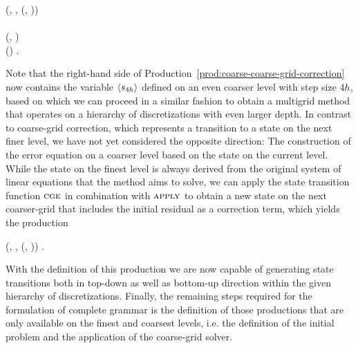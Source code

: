 \begin{bnf}
	 {
		(\bnfts{$\omega$}, \bnfsp {}, \bnfsp {}(, \bnfsp {})) \bnfor
	} \\
	 \\
	 {
		(, \bnfsp {})
	} \\
	 {
		() \bnfsp {} \bnfsp {}.
	}\label{prod:coarse-coarse-grid-correction}
\end{bnf}
Note that the right-hand side of Production~\eqref{prod:coarse-coarse-grid-correction} now contains the variable $\langle s_{4h} \rangle$ defined on an even coarser level with step size $4h$, based on which we can proceed in a similar fashion to obtain a multigrid method that operates on a hierarchy of discretizations with even larger depth.
In contrast to coarse-grid correction, which represents a transition to a state on the next finer level, we have not yet considered the opposite direction: The construction of the error equation on a coarser level based on the state on the current level.
While the state on the finest level is always derived from the original system of linear equations that the method aims to solve, we can apply the state transition function $\textsc{cge}$ in combination with $\textsc{apply}$ to obtain a new state on the next coarser-grid that includes the initial residual as a correction term, which yields the production
\begin{bnf}
 {
	(, \bnfsp {}, \bnfsp {}(, \bnfsp {}))
}.
\end{bnf}
With the definition of this production we are now capable of generating state transitions both in top-down as well as bottom-up direction within the given hierarchy of discretizations.
Finally, the remaining steps required for the formulation of complete grammar is the definition of those productions that are only available on the finest and coarsest levels, i.e. the definition of the initial problem and the application of the coarse-grid solver.

